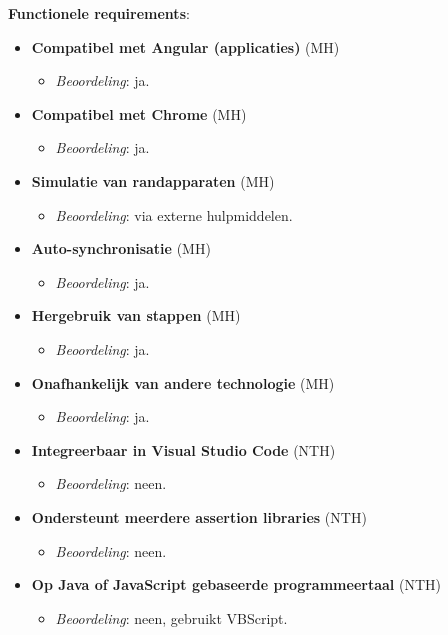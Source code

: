 \textbf{Functionele requirements}:
\begin{itemize}
	\item \textbf{Compatibel met Angular (applicaties)} (MH)
	\begin{itemize}
		\item \emph{Beoordeling}: ja.
	\end{itemize}
	\item \textbf{Compatibel met Chrome} (MH)
	\begin{itemize}
		\item \emph{Beoordeling}: ja.
	\end{itemize}
	\item \textbf{Simulatie van randapparaten} (MH)
	\begin{itemize}
		\item \emph{Beoordeling}: via externe hulpmiddelen.
	\end{itemize}
	\item \textbf{Auto-synchronisatie} (MH)
	\begin{itemize}
		\item \emph{Beoordeling}: ja.
	\end{itemize}
	\item \textbf{Hergebruik van stappen} (MH)
	\begin{itemize}
		\item \emph{Beoordeling}: ja.
	\end{itemize}
	\item \textbf{Onafhankelijk van andere technologie} (MH)
	\begin{itemize}
		\item \emph{Beoordeling}: ja.
	\end{itemize}
	\item \textbf{Integreerbaar in Visual Studio Code} (NTH)
	\begin{itemize}
		\item \emph{Beoordeling}: neen.
	\end{itemize}
	\item \textbf{Ondersteunt meerdere assertion libraries} (NTH)
	\begin{itemize}
		\item \emph{Beoordeling}: neen.
	\end{itemize}
	\item \textbf{Op Java of JavaScript gebaseerde programmeertaal} (NTH)
	\begin{itemize}
		\item \emph{Beoordeling}: neen, gebruikt VBScript.
	\end{itemize}
\end{itemize}

